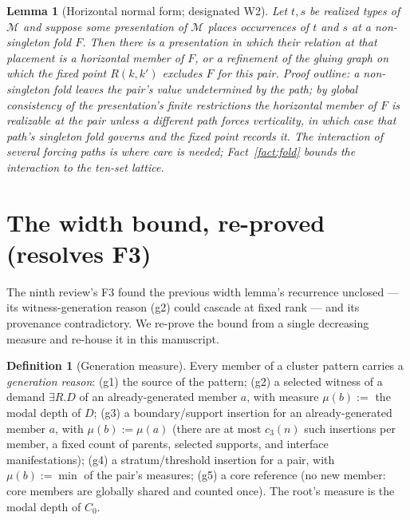\documentclass[11pt]{article}
\newtheorem{lemma}[theorem]{Lemma}
\theoremstyle{definition}
\newtheorem{definition}[theorem]{Definition}
\begin{document}
\begin{lemma}[Horizontal normal form; designated W2]\label{lem:hnf}
Let $t,s$ be realized types of $\mathcal M$ and suppose some
presentation of $\mathcal M$ places occurrences of $t$ and $s$ at a
non-singleton fold $F$.  Then there is a presentation in which their
relation at that placement is a horizontal member of $F$, or a
refinement of the gluing graph on which the fixed point $R(k,k')$
excludes $F$ for this pair.  \emph{Proof outline:} a non-singleton fold
leaves the pair's value undetermined by the path; by global consistency
of the presentation's finite restrictions the horizontal member of $F$
is realizable at the pair unless a \emph{different} path forces
verticality, in which case that path's singleton fold governs and the
fixed point records it.  The interaction of several forcing paths is
where care is needed; Fact~\ref{fact:fold} bounds the interaction to
the ten-set lattice.
\end{lemma}

\section{The width bound, re-proved (resolves F3)}\label{sec:width}

The ninth review's F3 found the previous width lemma's recurrence
unclosed --- its witness-generation reason (g2) could cascade at fixed
rank --- and its provenance contradictory.  We re-prove the bound from
a single decreasing measure and re-house it in this manuscript.

\begin{definition}[Generation measure]
Every member of a cluster pattern carries a \emph{generation reason}:
(g1) the source of the pattern; (g2) a selected witness of a demand
$\exists R.D$ of an already-generated member $a$, with measure
$\mu(b):=$ the modal depth of $D$; (g3) a boundary/support insertion
for an already-generated member $a$, with $\mu(b):=\mu(a)$ (there are
at most $c_3(n)$ such insertions per member, a fixed count of parents,
selected supports, and interface manifestations); (g4) a
stratum/threshold insertion for a pair, with
$\mu(b):=\min$ of the pair's measures; (g5) a core reference (no new
member: core members are globally shared and counted once).
The root's measure is the modal depth of $C_0$.
\end{definition}
\end{document}
